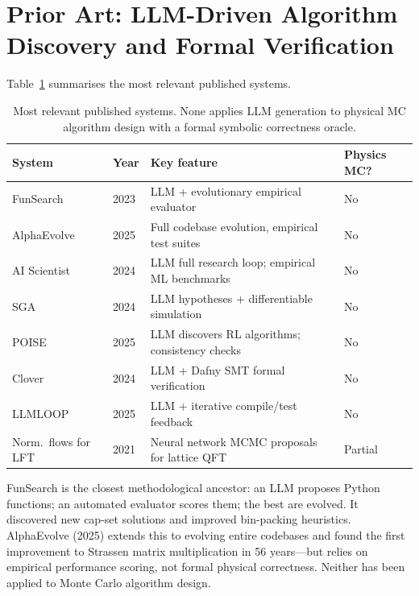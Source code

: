 \documentclass[10.5pt]{article}
\begin{document}
\section{Prior Art: LLM-Driven Algorithm Discovery and Formal Verification}

Table~\ref{tab:priorart} summarises the most relevant published systems.

\begin{table}[h]
\small
\centering
\renewcommand{\arraystretch}{1.25}
\begin{tabular}{p{3.5cm} p{2.2cm} p{4.5cm} p{2.0cm}}
\toprule
\textbf{System} & \textbf{Year} & \textbf{Key feature} & \textbf{Physics MC?} \\
\midrule
FunSearch \cite{funsearch2023} & 2023 & LLM + evolutionary empirical evaluator & No \\
AlphaEvolve \cite{alphaevolve2025} & 2025 & Full codebase evolution, empirical test suites & No \\
AI Scientist \cite{aiscientist2024} & 2024 & LLM full research loop; empirical ML benchmarks & No \\
SGA \cite{sga2024} & 2024 & LLM hypotheses + differentiable simulation & No \\
POISE \cite{poise2025} & 2025 & LLM discovers RL algorithms; consistency checks & No \\
Clover \cite{clover2024} & 2024 & LLM + Dafny SMT formal verification & No \\
LLMLOOP \cite{llmloop2025} & 2025 & LLM + iterative compile/test feedback & No \\
Norm.\ flows for LFT \cite{albergo2021} & 2021 & Neural network MCMC proposals for lattice QFT & Partial \\
\bottomrule
\end{tabular}
\caption{Most relevant published systems. None applies LLM generation to physical MC algorithm design with a formal symbolic correctness oracle.}
\label{tab:priorart}
\end{table}

FunSearch \cite{funsearch2023} is the closest methodological ancestor: an LLM
proposes Python functions; an automated evaluator scores them; the best are evolved.
It discovered new cap-set solutions and improved bin-packing heuristics.
AlphaEvolve \cite{alphaevolve2025} (2025) extends this to evolving entire codebases
and found the first improvement to Strassen matrix multiplication in 56 years---but
relies on empirical performance scoring, not formal physical correctness.  Neither
has been applied to Monte Carlo algorithm design.
\end{document}
